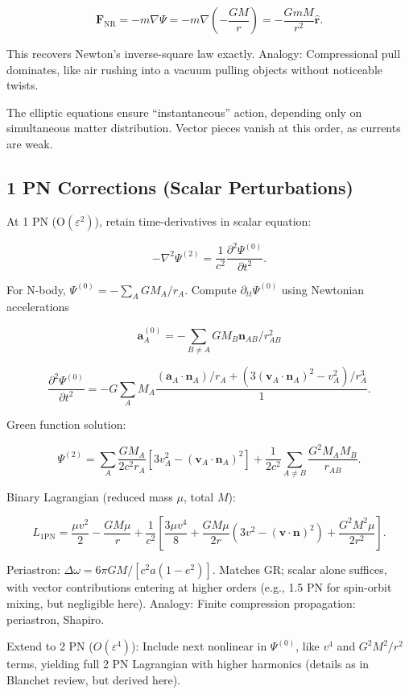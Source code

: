 \documentclass{article}
\begin{document}
\[
\mathbf{F}_{\text{NR}} = -m \nabla \Psi = -m \nabla \left(-\frac{GM}{r}\right) = - \frac{G m M}{r^2} \hat{\mathbf{r}}.
\]

This recovers Newton's inverse-square law exactly. Analogy: Compressional pull dominates, like air rushing into a vacuum pulling objects without noticeable twists.

The elliptic equations ensure ``instantaneous'' action, depending only on simultaneous matter distribution. Vector pieces vanish at this order, as currents are weak.

\subsection{1 PN Corrections (Scalar Perturbations)}

At 1 PN (O$(\varepsilon^2)$), retain time-derivatives in scalar equation:

\[
- \nabla^2 \Psi^{(2)} = \frac{1}{c^2} \frac{\partial^2 \Psi^{(0)}}{\partial t^2}.
\]

For N-body, $\Psi^{(0)} = - \sum_A GM_A / r_A$. Compute $\partial_{tt} \Psi^{(0)}$ using Newtonian accelerations

\[
\mathbf{a}_A^{(0)} = - \sum_{B \neq A} GM_B \mathbf{n}_{AB} / r_{AB}^2
\]

\[
\frac{\partial^2 \Psi^{(0)}}{\partial t^2} = - G \sum_A M_A \frac{(\mathbf{a}_A \cdot \mathbf{n}_A) / r_A + (3 (\mathbf{v}_A \cdot \mathbf{n}_A)^2 - v_A^2) / r_A^3 }{1}.
\]

Green function solution:

\[
\Psi^{(2)} = \sum_A \frac{GM_A}{2 c^2 r_A} [3 v_A^2 - (\mathbf{v}_A \cdot \mathbf{n}_A)^2] + \frac{1}{2 c^2} \sum_{A \neq B} \frac{G^2 M_A M_B}{ r_{AB}}.
\]

Binary Lagrangian (reduced mass $\mu$, total $M$):

\[
L_{1\text{PN}} = \frac{\mu v^2}{2} - \frac{GM \mu}{r} + \frac{1}{c^2} \left[ \frac{3\mu v^4}{8} + \frac{GM \mu}{2 r} (3 v^2 - (\mathbf{v} \cdot \mathbf{n})^2) + \frac{G^2 M^2 \mu}{2 r^2} \right].
\]

Periastron: $\Delta \omega = 6\pi GM / [c^2 a (1-e^2)]$. Matches GR; scalar alone suffices, with vector contributions entering at higher orders (e.g., 1.5 PN for spin-orbit mixing, but negligible here). Analogy: Finite compression propagation: periastron, Shapiro.

Extend to 2 PN ($O(\varepsilon^4)$): Include next nonlinear in $\Psi^{(0)}$, like $v^4$ and $G^2 M^2 / r^2$ terms, yielding full 2 PN Lagrangian with higher harmonics (details as in Blanchet review, but derived here).
\end{document}
